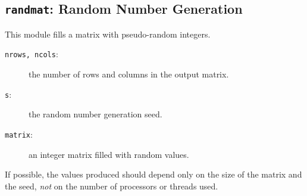 \subsection{{\tt{randmat}}: Random Number Generation\label{s:toys-rng}}

This module fills a matrix with pseudo-random integers.

{}

\begin{description}
\item[{\tt{nrows, ncols}}:]
	the number of rows and columns in the output matrix.
\item[{\tt{s}}:]
	the random number generation seed.
\end{description}

{\outputspec}

\begin{description}
\item[{\tt{matrix}}:]
	an integer matrix filled with random values.
\end{description}

If possible,
the values produced should depend only on the size of the matrix and the seed,
\emph{not} on the number of processors or threads used.
